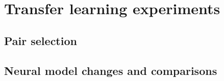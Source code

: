 \section{Transfer learning experiments}

\subsection{Pair selection}

\subsection{Neural model changes and comparisons}